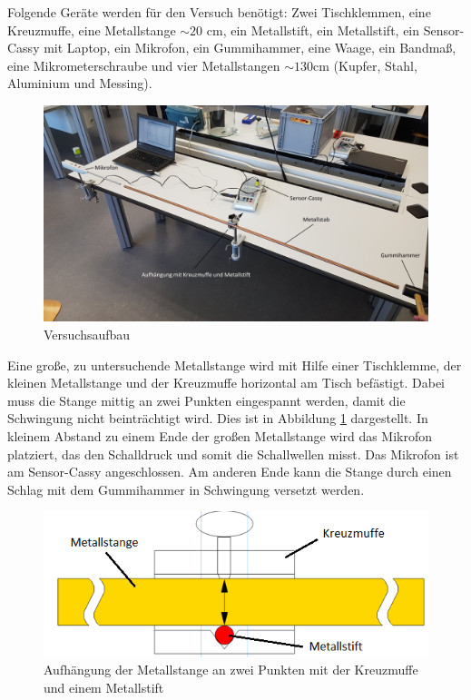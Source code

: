 \documentclass[a4paper, 12pt]{scrartcl}
\begin{document}
Folgende Geräte werden für den Versuch benötigt: Zwei Tischklemmen, eine Kreuzmuffe, eine Metallstange $\sim 20$ cm, ein Metallstift, ein Metallstift, ein Sensor-Cassy mit Laptop, ein Mikrofon, ein Gummihammer, eine Waage, ein Bandmaß, eine Mikrometerschraube und vier Metallstangen $\sim 130$cm (Kupfer, Stahl, Aluminium und Messing).

\begin{figure}[H]
	\centering
	\includegraphics[width=\linewidth]{bilder/aufbau_festkoerper.jpg}
	\caption{Versuchsaufbau}
\end{figure}

Eine große, zu untersuchende Metallstange wird mit Hilfe einer Tischklemme, der kleinen Metallstange und der Kreuzmuffe horizontal am Tisch befästigt. Dabei muss die Stange mittig an zwei Punkten eingespannt werden, damit die Schwingung nicht beinträchtigt wird. Dies ist in Abbildung \ref{pic:aufhaengung} dargestellt. In kleinem Abstand zu einem Ende der großen Metallstange wird das Mikrofon platziert, das den Schalldruck und somit die Schallwellen misst. Das Mikrofon ist am Sensor-Cassy angeschlossen. Am anderen Ende kann die Stange durch einen Schlag mit dem Gummihammer in Schwingung versetzt werden.

\begin{figure}[H]
	\centering
	\includegraphics{bilder/aufhaengung_beschriftet.png}
	\caption{Aufhängung der Metallstange an zwei Punkten mit der Kreuzmuffe und einem Metallstift}
	\label{pic:aufhaengung}
\end{figure}
\end{document}
